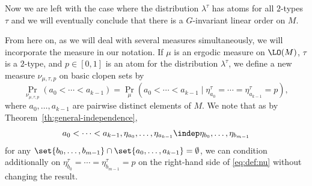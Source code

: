 Now we are left with the case where the distribution $\lambda^\tau$ has atoms for all $2$-types~$\tau$ and we will eventually conclude that there is a $G$-invariant linear order on $M$.

From here on, as we will deal with several measures simultaneously, we will incorporate the measure in our notation. If $\mu$ is an ergodic measure on $\LO(M)$, $\tau$ is a $2$-type, and $p \in [0, 1]$ is an atom for the distribution $\lambda^\tau$, we define a new measure $\nu_{\mu, \tau, p}$ on basic clopen sets by
\begin{equation}
\label{eq:def:nu}
\Pr_{\nu_{\mu, \tau, p}}(a_0 < \cdots < a_{k-1}) = \Pr_\mu(a_0 < \cdots < a_{k-1} \mid \eta_{a_0}^\tau = \cdots = \eta_{a_{k-1}}^\tau = p),
\end{equation}
where $a_0, \ldots, a_{k-1}$ are pairwise distinct elements of $M$. We note that as by Theorem~\ref{th:general-independence},
\begin{equation*}
a_0 < \cdots < a_{k-1}, \eta_{a_0}, \ldots, \eta_{a_{k-1}} \indep \eta_{b_0}, \ldots, \eta_{b_{m-1}}
\end{equation*}
for any $\set{b_0, \ldots, b_{m-1}} \cap \set{a_0, \ldots, a_{k-1}} = \emptyset$, we can condition additionally on $\eta_{b_0}^\tau = \cdots = \eta_{b_{m-1}}^\tau = p$ on the right-hand side of \eqref{eq:def:nu} without changing the result.


